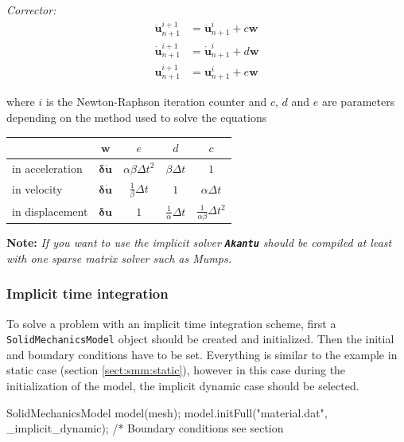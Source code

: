\documentclass[a4paper,11pt]{book}
\newcommand{\akantu}{{\texttt{\textbf{Akantu}}}\xspace}
\newcommand{\code}[1]{\texttt{#1}}
\newcommand{\note}[1]{\textbf{Note: }\textit{#1}}
\renewcommand{\vec}[1]{\ensuremath{\boldsymbol{#1}}}
\begin{document}
\noindent\textit{Corrector:}
\begin{align}
  \vec{\ddot{u}}_{n+1}^{i+1} &= \vec{\ddot{u}}_{n+1}^{i} + c \vec{w} \\
  \vec{\dot{u}}_{n+1}^{i+1} &= \vec{\dot{u}}_{n+1}^{i} + d \vec{w} \\
  \vec{u}_{n+1}^{i+1} &= \vec{u}_{n+1}^{i} + e \vec{w}
\end{align}

where  $i$ is  the Newton-Raphson  iteration counter  and $c$,  $d$ and  $e$ are
parameters depending on the method used to solve the equations

\begin{center}
  \begin{tabular}{lcccc}
    \toprule
    & $\vec{w}$ & $e$ & $d$ & $c$\\
    \midrule
    in  acceleration  &$ \vec{\delta  \ddot{u}}$  &  $\alpha  \beta \Delta  t^2$
    &$\beta \Delta t$ &$1$\\
    in velocity  & $ \vec{\delta \dot{u}}$&  $\frac{1}{\beta} \Delta t$  & $1$ &
    $\alpha \Delta t$\\
    in displacement  &$\vec{\delta u}$  & $ 1$  & $\frac{1}{\alpha} \Delta  t$ &
    $\frac{1}{\alpha \beta} \Delta t^2$\\
    \bottomrule
  \end{tabular}
\end{center}

\note{If you want to use the implicit solver \akantu should be compiled at least
  with one sparse matrix solver such as Mumps\cite{mumps}.}


\subsubsection{Implicit time integration}
To  solve  a  problem with  an  implicit  time  integration scheme,  first  a
\code{SolidMechanicsModel} object  should be created and  initialized.  Then the
initial and  boundary conditions have to  be set.  Everything is  similar to the
example  in static case  (section \ref{sect:smm:static}),  however in  this case
during  the initialization of  the model,  the implicit  dynamic case  should be
selected.

\begin{cpp}
  SolidMechanicsModel model(mesh);
  model.initFull("material.dat", _implicit_dynamic);
  /* Boundary conditions see section %
\end{cpp}
\end{document}

